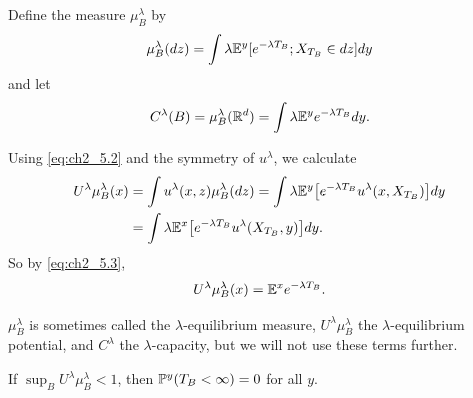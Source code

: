 Define the measure $\mu_B^\lambda$ by
\begin{equation}\label{eq:ch2_5.4}
    \mu_B^\lambda(dz) = \int \lambda\E^y[e^{-\lambda T_B}; X_{T_B} \in dz]dy
\end{equation}
and let
\begin{equation}\label{eq:ch2_5.5}
    C^\lambda(B) = \mu_B^\lambda(\R^d) = \int \lambda\E^ye^{-\lambda T_B}dy.
\end{equation}

\mpagebreak

Using \eqref{eq:ch2_5.2} and the symmetry of $u^\lambda$, we calculate
\begin{align*}
    U^\lambda\mu_B^\lambda(x) &= \int u^\lambda(x,z)\mu_B^\lambda(dz) = \int \lambda\E^y\big[e^{-\lambda T_B}u^\lambda(x,X_{T_B})\big]dy \\
    &= \int \lambda\E^x\big[e^{-\lambda T_B}u^\lambda(X_{T_B},y)\big]dy.
\end{align*}
So by \eqref{eq:ch2_5.3},
\begin{equation}\label{eq:ch2_5.6}
    U^\lambda\mu_B^\lambda(x) = \E^xe^{-\lambda T_B}.
\end{equation}

$\mu_B^\lambda$ is sometimes called the $\lambda$-equilibrium measure, $U^\lambda\mu_B^\lambda$ the $\lambda$-equilibrium potential, and $C^\lambda$ the $\lambda$-capacity, but we will not use these terms further.

\begin{proposition}\label{prop:ch2_5.4}
If $\sup_B U^\lambda\mu_B^\lambda < 1$, then $\P^y(T_B < \infty) = 0$ for all $y$.
\end{proposition}

